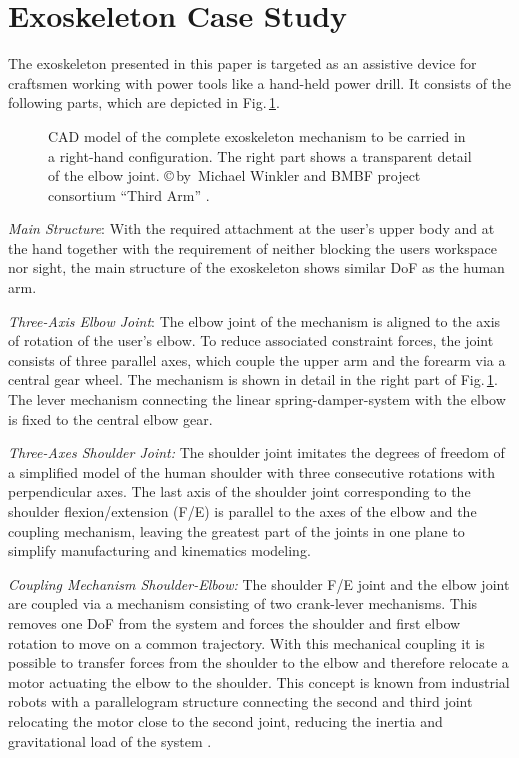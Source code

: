 \documentclass{svproc}
\begin{document}
\section{Exoskeleton Case Study}
\label{sec:exo_scenario}

The exoskeleton presented in this paper is targeted as an assistive device for craftsmen working with power tools like a hand-held power drill.
It consists of the following parts, which are depicted in Fig.\,\ref{fig:KAS5_CAD}.

\begin{figure}[b!]
    \vspace{-0.3cm}
    
    \vspace{-0.3cm}
    \caption{CAD model of the complete exoskeleton mechanism to be carried in a right-hand configuration. The right part shows a transparent detail of the elbow joint.
    \copyright\,by~Michael Winkler and BMBF project consortium ``Third Arm'' \cite{NuelleSchTapLil2017}.}
    \label{fig:KAS5_CAD}
\end{figure} 

\emph{Main Structure}:
%
With the required attachment at the user's upper body and at the hand together with the requirement of neither blocking the users workspace nor sight, the main structure of the exoskeleton shows similar DoF as the human arm.

\emph{Three-Axis Elbow Joint}:
The elbow joint of the mechanism is aligned to the axis of rotation of the user's elbow.
To reduce associated constraint forces, the joint consists of three parallel axes, which couple the upper arm and the forearm via a central gear wheel.
The mechanism is shown in detail in the right part of Fig.\,\ref{fig:KAS5_CAD}.
The lever mechanism connecting the linear spring-damper-system with the elbow is fixed to the central elbow gear.

\emph{Three-Axes Shoulder Joint:}
The shoulder joint imitates the degrees of freedom of a simplified model of the human shoulder with three consecutive rotations with perpendicular axes.
The last axis of the shoulder joint corresponding to the shoulder flexion/extension (F/E) is parallel to the axes of the elbow and the coupling mechanism, leaving the greatest part of the joints in one plane to simplify manufacturing and kinematics modeling.

\emph{Coupling Mechanism Shoulder-Elbow:}
The shoulder F/E joint and the elbow joint are coupled via a mechanism consisting of two crank-lever mechanisms.
This removes one DoF from the system and forces the shoulder and first elbow rotation to move on a common trajectory.
With this mechanical coupling it is possible to transfer forces from the shoulder to the elbow and therefore relocate a motor actuating the elbow to the shoulder.
This concept is known from industrial robots with a parallelogram structure connecting the second and third joint relocating the motor close to the second joint, reducing the inertia and gravitational load of the system \cite{LuhZhe1985}.
\end{document}
